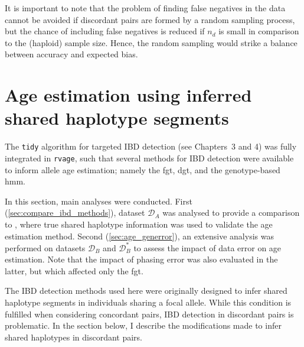 It is important to note that the problem of finding false negatives in the data cannot be avoided if discordant pairs are formed by a random sampling process, but the chance of including false negatives is reduced if $n_d$ is small in comparison to the (haploid) sample size.
Hence, the random sampling would strike a balance between accuracy and expected bias.














%
\section{Age estimation using inferred shared haplotype segments}
%


The \texttt{tidy} algorithm for targeted IBD detection (see Chapters~3 and 4) was fully integrated in \texttt{rvage}, such that several methods for IBD detection were available to inform allele age estimation;
namely the \gls{fgt}, \gls{dgt}, and the genotype-based \gls{hmm}.

In this section,  main analyses were conducted.
First (\cref{sec:compare_ibd_methods}), dataset $\mathcal{D}_A$ was analysed to provide a comparison to , where true shared haplotype information was used to validate the age estimation method.
Second (\cref{sec:age_generror}), an extensive analysis was performed on datasets $\mathcal{D}_B$ and $\mathcal{D}_B^{\ast}$ to assess the impact of data error on age estimation.
Note that the impact of phasing error was also evaluated in the latter, but which affected only the \gls{fgt}.

The IBD detection methods used here were originally designed to infer shared haplotype segments in individuals sharing a focal allele.
While this condition is fulfilled when considering concordant pairs, IBD detection in discordant pairs is problematic.
In the section below, I describe the modifications made to infer shared haplotypes in discordant pairs.


